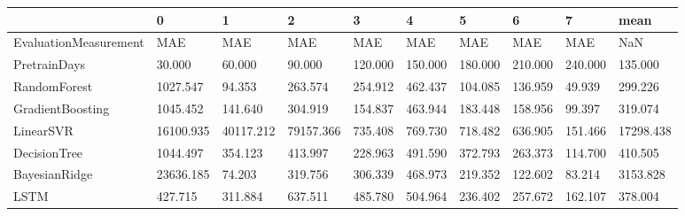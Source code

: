 \begin{tabular}{llllllllll}
\toprule
{} &         0 &         1 &         2 &       3 &       4 &       5 &       6 &       7 &      mean \\
\midrule
EvaluationMeasurement &       MAE &       MAE &       MAE &     MAE &     MAE &     MAE &     MAE &     MAE &       NaN \\
PretrainDays          &    30.000 &    60.000 &    90.000 & 120.000 & 150.000 & 180.000 & 210.000 & 240.000 &   135.000 \\
RandomForest          &  1027.547 &    94.353 &   263.574 & 254.912 & 462.437 & 104.085 & 136.959 &  49.939 &   299.226 \\
GradientBoosting      &  1045.452 &   141.640 &   304.919 & 154.837 & 463.944 & 183.448 & 158.956 &  99.397 &   319.074 \\
LinearSVR             & 16100.935 & 40117.212 & 79157.366 & 735.408 & 769.730 & 718.482 & 636.905 & 151.466 & 17298.438 \\
DecisionTree          &  1044.497 &   354.123 &   413.997 & 228.963 & 491.590 & 372.793 & 263.373 & 114.700 &   410.505 \\
BayesianRidge         & 23636.185 &    74.203 &   319.756 & 306.339 & 468.973 & 219.352 & 122.602 &  83.214 &  3153.828 \\
LSTM                  &   427.715 &   311.884 &   637.511 & 485.780 & 504.964 & 236.402 & 257.672 & 162.107 &   378.004 \\
\bottomrule
\end{tabular}

